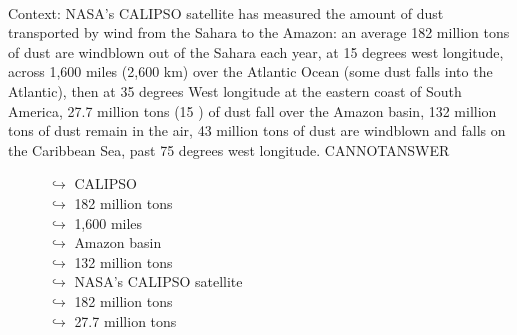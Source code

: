 \documentclass[11pt,a4paper, onecolumn]{article}
\begin{document}
\\ Context: NASA's CALIPSO satellite has measured the amount of dust transported by wind from the Sahara to the Amazon: an average 182 million tons of dust are windblown out of the Sahara each year, at 15 degrees west longitude, across 1,600 miles (2,600 km) over the Atlantic Ocean (some dust falls into the Atlantic), then at 35 degrees West longitude at the eastern coast of South America, 27.7 million tons (15 ) of dust fall over the Amazon basin, 132 million tons of dust remain in the air, 43 million tons of dust are windblown and falls on the Caribbean Sea, past 75 degrees west longitude. CANNOTANSWER

\begin{figure}[t] \small \begin{tcolorbox}[boxsep=0pt,left=5pt,right=0pt,top=2pt,colback = yellow!5] \begin{dialogue}
 \small 
\colorbox{pink!25}{$\hookrightarrow$}
{ CALIPSO }
\\
\colorbox{pink!25}{$\hookrightarrow$}
{ 182 million tons }
\\
\colorbox{pink!25}{$\hookrightarrow$}
{ 1,600 miles }
\\
\colorbox{pink!25}{$\hookrightarrow$}
{ Amazon basin }
\\
\colorbox{pink!25}{$\hookrightarrow$}
{ 132 million tons }
\\
\colorbox{pink!25}{$\hookrightarrow$}
{ NASA's CALIPSO satellite }
\\
\colorbox{pink!25}{$\hookrightarrow$}
{ 182 million tons }
\\
\colorbox{pink!25}{$\hookrightarrow$}
{ 27.7 million tons }

\end{dialogue}
\end{tcolorbox}
\end{figure}
\end{document}

